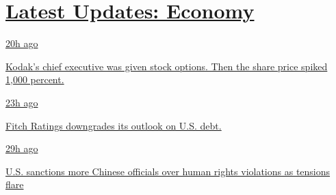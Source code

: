 \hypertarget{latest-updates-economy}{%
\section{\texorpdfstring{\href{https://www.nytimes3xbfgragh.onion/live/2020/07/31/business/stock-market-today-coronavirus?action=click\&pgtype=Article\&state=default\&region=MAIN_CONTENT_1\&context=storylines_live_updates}{Latest
Updates:
Economy}}{Latest Updates: Economy}}\label{latest-updates-economy}}

\href{https://www.nytimes3xbfgragh.onion/live/2020/07/31/business/stock-market-today-coronavirus?action=click\&pgtype=Article\&state=default\&region=MAIN_CONTENT_1\&context=storylines_live_updates\#kodaks-chief-executive-was-given-stock-options-then-the-share-price-spiked-1000-percent}{20h
ago}

\href{https://www.nytimes3xbfgragh.onion/live/2020/07/31/business/stock-market-today-coronavirus?action=click\&pgtype=Article\&state=default\&region=MAIN_CONTENT_1\&context=storylines_live_updates\#kodaks-chief-executive-was-given-stock-options-then-the-share-price-spiked-1000-percent}{Kodak's
chief executive was given stock options. Then the share price spiked
1,000 percent.}

\href{https://www.nytimes3xbfgragh.onion/live/2020/07/31/business/stock-market-today-coronavirus?action=click\&pgtype=Article\&state=default\&region=MAIN_CONTENT_1\&context=storylines_live_updates\#fitch-ratings-downgrades-its-outlook-on-us-debt}{23h
ago}

\href{https://www.nytimes3xbfgragh.onion/live/2020/07/31/business/stock-market-today-coronavirus?action=click\&pgtype=Article\&state=default\&region=MAIN_CONTENT_1\&context=storylines_live_updates\#fitch-ratings-downgrades-its-outlook-on-us-debt}{Fitch
Ratings downgrades its outlook on U.S. debt.}

\href{https://www.nytimes3xbfgragh.onion/live/2020/07/31/business/stock-market-today-coronavirus?action=click\&pgtype=Article\&state=default\&region=MAIN_CONTENT_1\&context=storylines_live_updates\#us-sanctions-more-chinese-officials-over-human-rights-violations-as-tensions-flare}{29h
ago}

\href{https://www.nytimes3xbfgragh.onion/live/2020/07/31/business/stock-market-today-coronavirus?action=click\&pgtype=Article\&state=default\&region=MAIN_CONTENT_1\&context=storylines_live_updates\#us-sanctions-more-chinese-officials-over-human-rights-violations-as-tensions-flare}{U.S.
sanctions more Chinese officials over human rights violations as
tensions flare}

